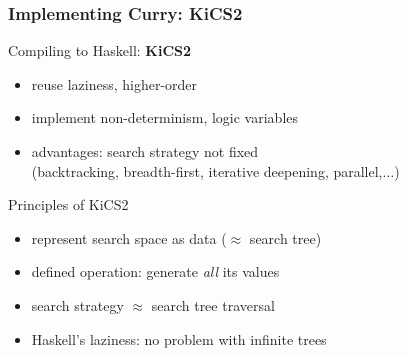\documentclass[10pt]{beamer}
\begin{document}
\begin{frame}[fragile]
\frametitle{Implementing Curry: KiCS2}

\begin{block}{Compiling to Haskell: {\bf KiCS2} {\lgrey[WFLP'11]}}
\begin{itemize}
\item reuse laziness, higher-order
\item implement non-determinism, logic variables
\item advantages: \alert{search strategy not fixed}\\
      (backtracking, breadth-first, iterative deepening, parallel,$\ldots$)
\end{itemize}
\end{block}
\pause
\begin{block}{Principles of KiCS2}
\begin{itemize}\expandlist{2ex}
\item represent search space as data ($\approx$ search tree)
\item defined operation: generate \emph{all} its values
\item search strategy $\approx$ search tree traversal
\item Haskell's laziness: no problem with infinite trees
\end{itemize}
\end{block}
\end{frame}
\end{document}
